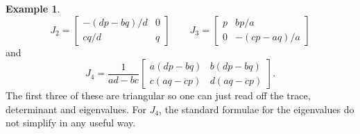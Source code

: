\documentclass[reqno]{amsart}
\theoremstyle{definition}
\newtheorem{example}[theorem]{Example}
\begin{document}
\begin{example}
\[    J_2 = \left[\begin{array}{cc} -(dp-bq)/d & 0 \\ cq/d & q \end{array}\right] \qquad
    J_3 = \left[\begin{array}{cc} p & bp/a \\ 0 & -(cp-aq)/a \end{array}\right]
 \]
 and
 \[ J_4 = \frac{1}{ad-bc} \left[\begin{array}{cc} a(dp-bq) & b(dp-bq) \\
                               c(aq-cp) & d(aq-cp) \end{array}\right].
 \]
 The first three of these are triangular so one can just read off the
 trace, determinant and eigenvalues.  For $J_4$, the standard formulae
 for the eigenvalues do not simplify in any useful way.
\end{example}

\newpage
\end{document}

